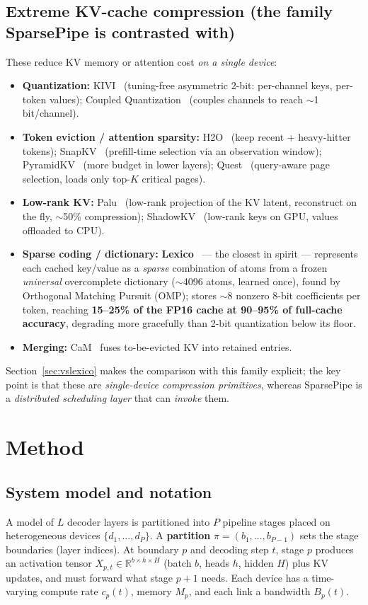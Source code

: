 \documentclass[11pt]{article}
\newcommand{\term}[1]{\textbf{\color{accent!85!black}#1}}
\newcommand{\R}{\mathbb{R}}
\begin{document}
\subsection{Extreme KV-cache compression (the family SparsePipe is contrasted with)}
These reduce KV memory or attention cost \emph{on a single device}:
\begin{itemize}[leftmargin=1.5em,itemsep=1pt]
\item \term{Quantization:} KIVI~\cite{kivi} (tuning-free asymmetric 2-bit: per-channel keys,
per-token values); Coupled Quantization~\cite{cq} (couples channels to reach $\sim$1 bit/channel).
\item \term{Token eviction / attention sparsity:} H2O~\cite{h2o} (keep recent + heavy-hitter
tokens); SnapKV~\cite{snapkv} (prefill-time selection via an observation window);
PyramidKV~\cite{pyramidkv} (more budget in lower layers); Quest~\cite{quest} (query-aware
page selection, loads only top-$K$ critical pages).
\item \term{Low-rank KV:} Palu~\cite{palu} (low-rank projection of the KV latent, reconstruct
on the fly, $\sim$50\% compression); ShadowKV~\cite{shadowkv} (low-rank keys on GPU, values
offloaded to CPU).
\item \term{Sparse coding / dictionary:} \term{Lexico}~\cite{lexico} --- the closest in
spirit --- represents each cached key/value as a \emph{sparse} combination of atoms from a
frozen \emph{universal} overcomplete dictionary ($\sim$4096 atoms, learned once), found by
Orthogonal Matching Pursuit (OMP); stores $\sim$8 nonzero 8-bit coefficients per token,
reaching \textbf{15--25\% of the FP16 cache at 90--95\% of full-cache accuracy}, degrading
more gracefully than 2-bit quantization below its floor.
\item \term{Merging:} CaM~\cite{cam} fuses to-be-evicted KV into retained entries.
\end{itemize}
Section~\ref{sec:vslexico} makes the comparison with this family explicit; the key point is
that these are \emph{single-device compression primitives}, whereas SparsePipe is a
\emph{distributed scheduling layer} that can \emph{invoke} them.

\section{Method}
\label{sec:method}

\subsection{System model and notation}
A model of $L$ decoder layers is partitioned into $P$ pipeline stages placed on
heterogeneous devices $\{d_1,\dots,d_P\}$. A \term{partition} $\pi=(b_1,\dots,b_{P-1})$ sets
the stage boundaries (layer indices). At boundary $p$ and decoding step $t$, stage $p$
produces an activation tensor $X_{p,t}\in\R^{b\times h\times H}$ (batch $b$, heads $h$,
hidden $H$) plus KV updates, and must forward what stage $p{+}1$ needs. Each device has a
time-varying compute rate $c_p(t)$, memory $M_p$, and each link a bandwidth $B_p(t)$.
\end{document}

